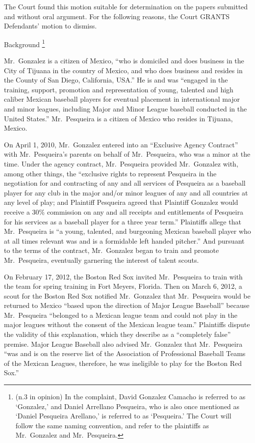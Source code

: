 \documentclass[11pt,letterpaper,twoside]{article}
\begin{document}
The Court found this motion suitable for determination on the papers
submitted and without oral argument. For the following reasons, the
Court GRANTS Defendants' motion to dismiss.

{Background \footnote{(n.3 in opinion) In the complaint, David Gonzalez
  Camacho is referred to as `Gonzalez,' and Daniel Arrellano Pesqueira,
  who is also once mentioned as `Daniel Pesqueira Arellano,' is referred
  to as `Pesqueira.' The Court will follow the same naming convention,
  and refer to the plaintiffs as Mr.~Gonzalez and Mr.~Pesqueira.}}

Mr.~Gonzalez is a citizen of Mexico, ``who is domiciled and does
business in the City of Tijuana in the country of Mexico, and who does
business and resides in the County of San Diego, California, USA.'' He
is and was ``engaged in the training, support, promotion and
representation of young, talented and high caliber Mexican baseball
players for eventual placement in international major and minor leagues,
including Major and Minor League baseball conducted in the United
States.'' Mr.~Pesqueira is a citizen of Mexico who resides in Tijuana,
Mexico.

On April 1, 2010, Mr.~Gonzalez entered into an ``Exclusive Agency
Contract'' with Mr.~Pesqueira's parents on behalf of Mr.~Pesqueira, who
was a minor at the time. Under the agency contract, Mr.~Pesqueira
provided Mr.~Gonzalez with, among other things, the ``exclusive rights
to represent Pesqueira in the negotiation for and contracting of any and
all services of Pesqueira as a baseball player for any club in the major
and/or minor leagues of any and all countries at any level of play; and
Plaintiff Pesqueira agreed that Plaintiff Gonzalez would receive a 30\%
commission on any and all receipts and entitlements of Pesqueira for his
services as a baseball player for a three year term.'' Plaintiffs allege
that Mr.~Pesqueira is ``a young, talented, and burgeoning Mexican
baseball player who at all times relevant was and is a formidable left
handed pitcher.'' And pursuant to the terms of the contract,
Mr.~Gonzalez began to train and promote Mr.~Pesqueira, eventually
garnering the interest of talent scouts.

On February 17, 2012, the Boston Red Sox invited Mr.~Pesqueira to train
with the team for spring training in Fort Meyers, Florida. Then on March
6, 2012, a scout for the Boston Red Sox notified Mr.~Gonzalez that
Mr.~Pesqueira would be returned to Mexico ``based upon the direction of
Major League Baseball'' because Mr.~Pesqueira ``belonged to a Mexican
league team and could not play in the major leagues without the consent
of the Mexican league team.'' Plaintiffs dispute the validity of this
explanation, which they describe as a ``completely false'' premise.
Major League Baseball also advised Mr.~Gonzalez that Mr.~Pesqueira ``was
and is on the reserve list of the Association of Professional Baseball
Teams of the Mexican Leagues, therefore, he was ineligible to play for
the Boston Red Sox.''
\end{document}
